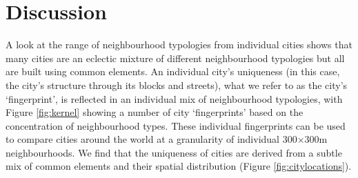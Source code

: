 \documentclass[9pt,twocolumn,twoside,lineno]{pnas-new}
\begin{document}



























%
%
%
%
%
%
% 

\section*{Discussion}


A look at the range of neighbourhood typologies from individual cities shows that many cities are an eclectic mixture of different neighbourhood typologies but all are built using common elements. An individual city's uniqueness (in this case, the city's structure through its blocks and streets), what we refer to as the city's `fingerprint', is reflected in an individual mix of neighbourhood typologies, with Figure \ref{fig:kernel} showing a number of city `fingerprints' based on the concentration of neighbourhood types. These individual fingerprints can be used to compare cities around the world at a granularity of individual 300$\times$300m neighbourhoods. We find that the uniqueness of cities are derived from a subtle mix of common elements and their spatial distribution (Figure \ref{fig:citylocations}).
\end{document}
